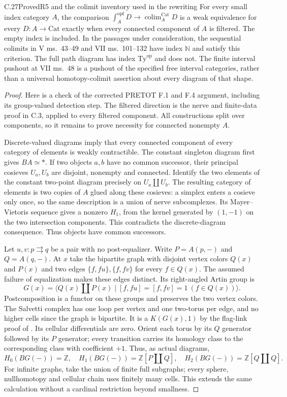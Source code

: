 \begin{claim}{C.27}{Proved}{R5 and the colimit inventory used in the rewriting}
For every small index category $A$, the comparison
$\int_A^{\mathrm{opf}}D\to\operatorname{colim}^{\mathrm{Cat}}_A D$
is a weak equivalence for every $D:A\to\mathrm{Cat}$ exactly
when every connected component of $A$ is filtered. The empty
index is included. In the passages under consideration, the
sequential colimits in V ms.~43--49 and VII ms.~101--132 have
index $\mathbb N$ and satisfy this criterion. The full path
diagram has index $\mathrm{Ty}^{\mathrm{op}}$ and does not.
The finite interval pushout at VII ms.~48 is a pushout of the
specified free interval categories, rather than a universal
homotopy-colimit assertion about every diagram of that shape.
\end{claim}
\begin{proof}
Here is a check of the corrected PRETOT F.1 and F.4 argument,
including its group-valued detection step. The filtered direction
is the nerve and finite-data proof in C.3, applied to every
filtered component. All constructions split over components, so
it remains to prove necessity for connected nonempty $A$.

Discrete-valued diagrams imply that every connected component of
every category of elements is weakly contractible. The constant
singleton diagram first gives $BA\simeq *$. If two objects
$a,b$ have no common successor, their principal cosieves $U_a,U_b$
are disjoint, nonempty and connected. Identify the two elements
of the constant two-point diagram precisely on $U_a\amalg U_b$.
The resulting category of elements is two copies of $A$ glued
along these cosieves: a simplex enters a cosieve only once, so
the same description is a union of nerve subcomplexes. Its
Mayer--Vietoris sequence gives a nonzero $H_1$, from the kernel
generated by $(1,-1)$ on the two intersection components. This
contradicts the discrete-diagram consequence. Thus objects have
common successors.

Let $u,v:p\rightrightarrows q$ be a pair with no post-equalizer.
Write $P=A(p,-)$ and $Q=A(q,-)$. At $x$ take the bipartite
graph with disjoint vertex colors $Q(x)$ and $P(x)$ and two
edges $\{f,fu\},\{f,fv\}$ for every $f\in Q(x)$. The assumed
failure of equalization makes these edges distinct. Its
right-angled Artin group is
\[
 G(x)=\langle Q(x)\amalg P(x)\mid
                 [f,fu]=[f,fv]=1\ (f\in Q(x))\rangle.
\]
Postcomposition is a functor on these groups and preserves the
two vertex colors. The Salvetti complex has one loop per vertex
and one two-torus per edge, and no higher cells since the graph
is bipartite. It is a $K(G(x),1)$ by the flag-link proof of
\cite[Theorem~2.6]{CpathsCharney}. Its cellular differentials
are zero. Orient each torus by its $Q$ generator followed by its
$P$ generator; every transition carries its homology class to
the corresponding class with coefficient $+1$. Thus, as actual
diagrams,
\[
 H_0(BG(-))=\mathbb Z,\quad
 H_1(BG(-))=\mathbb Z[P\amalg Q],\quad
 H_2(BG(-))=\mathbb Z[Q\amalg Q].
\]
For infinite graphs, take the union of finite full subgraphs;
every sphere, nullhomotopy and cellular chain uses finitely many
cells. This extends the same calculation without a cardinal
restriction beyond smallness.


\end{proof}
